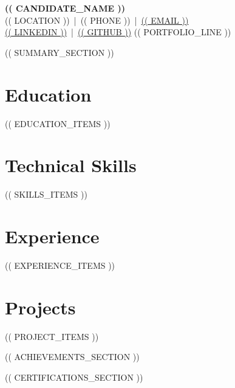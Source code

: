 \documentclass[a4paper,9pt]{article}
\newcommand{\resumeSubHeadingListStart}{\begin{itemize}[leftmargin=0.15in, label={}]}
\newcommand{\resumeSubHeadingListEnd}{\end{itemize}}
\begin{document}
\begin{center}
    {\Large \textbf{(( CANDIDATE_NAME ))}}\\[-1pt]
    (( LOCATION )) \,|\, (( PHONE )) \,|\,
    \href{mailto:(( EMAIL ))}{(( EMAIL ))}\\[-1pt]
    \href{https://(( LINKEDIN ))}{(( LINKEDIN ))}
    \,|\, 
    \href{https://(( GITHUB ))}{(( GITHUB ))}
    (( PORTFOLIO_LINE ))
\end{center}

(( SUMMARY_SECTION ))

\section{Education}
  \resumeSubHeadingListStart
(( EDUCATION_ITEMS ))
  \resumeSubHeadingListEnd

\section{Technical Skills}
 \begin{itemize}[leftmargin=0.15in, label={}]
    \small{\item{
(( SKILLS_ITEMS ))
    }}
 \end{itemize}

\section{Experience}
  \resumeSubHeadingListStart
(( EXPERIENCE_ITEMS ))
  \resumeSubHeadingListEnd

\section{Projects}
  \resumeSubHeadingListStart
(( PROJECT_ITEMS ))
  \resumeSubHeadingListEnd

(( ACHIEVEMENTS_SECTION ))

(( CERTIFICATIONS_SECTION ))
\end{document}
